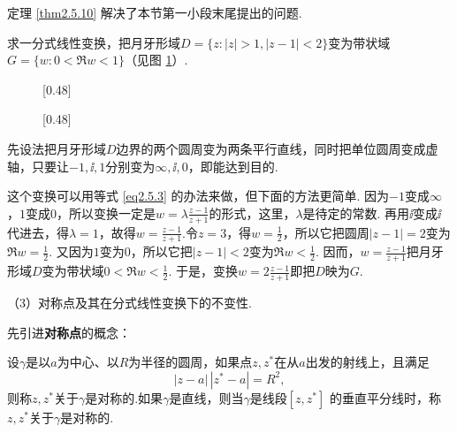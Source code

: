 定理 \ref{thm2.5.10} 解决了本节第一小段末尾提出的问题.
\begin{example}\label{exam2.5.11}
  求一分式线性变换，把月牙形域$D=\{z:|z|>1,|z-1|<2\}$变为带状域$G=\{w:0<\Re w<1\}$（见图 \ref{fig2.12}）.
\end{example}
\begin{figure}[!ht]
  \centering
  \subcaptionbox{\label{fig2.12a}}[0.48\textwidth]
    {
    }
  \subcaptionbox{\label{fig2.12b}}[0.48\textwidth]
    {
    }
  \caption{\label{fig2.12}}
\end{figure}

\begin{solution}
  先设法把月牙形域$D$边界的两个圆周变为两条平行直线，同时把单位圆周变成虚轴，只要让$-1,\ii,1$分别变为$\infty,\ii,0$，即能达到目的.

  这个变换可以用等式 \ref{eq2.5.3} 的办法来做，但下面的方法更简单. 因为$-1$变成$\infty$，$1$变成$0$，所以变换一定是$w=\lambda\frac{z-1}{z+1}$的形式，这里，$\lambda$是待定的常数. 再用$\ii$变成$\ii$代进去，得$\lambda=1$，故得$w=\frac{z-1}{z+1}$.令$z=3$，得$w=\frac12$，所以它把圆周$|z-1|=2$变为$\Re w=\frac12$. 又因为$1$变为$0$，所以它把$|z-1|<2$变为$\Re w<\frac12$. 因而，$w=\frac{z-1}{z+1}$把月牙形域$D$变为带状域$0<\Re w<\frac12$. 于是，变换$w=2\frac{z-1}{z+1}$即把$D$映为$G$.
\end{solution}



（3）{\kaishu 对称点及其在分式线性变换下的不变性.}

先引进\textbf{对称点}的概念：
\begin{definition}\label{def2.5.12}
  设$\gamma$是以$a$为中心、以$R$为半径的圆周，如果点$z,z^\ast$在从$a$出发的射线上，且满足
  \begin{equation}\label{eq2.5.7}
    |z-a| \, |z^\ast-a| = R^2,
  \end{equation}
  则称$z,z^\ast$关于$\gamma$是对称的.如果$\gamma$是直线，则当$\gamma$是线段$[z,z^\ast]$
  的垂直平分线时，称$z,z^\ast$关于$\gamma$是对称的.
\end{definition}

